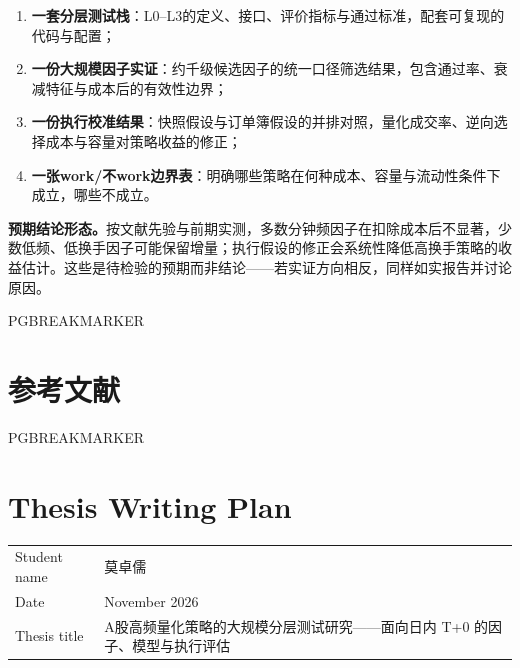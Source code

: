 \documentclass[11pt,a4paper]{article}
\begin{document}
\begin{enumerate}
  \item \textbf{一套分层测试栈}：L0--L3的定义、接口、评价指标与通过标准，配套可复现的代码与配置；
  \item \textbf{一份大规模因子实证}：约千级候选因子的统一口径筛选结果，包含通过率、衰减特征与成本后的有效性边界；
  \item \textbf{一份执行校准结果}：快照假设与订单簿假设的并排对照，量化成交率、逆向选择成本与容量对策略收益的修正；
  \item \textbf{一张work/不work边界表}：明确哪些策略在何种成本、容量与流动性条件下成立，哪些不成立。
\end{enumerate}

\textbf{预期结论形态。}按文献先验与前期实测，多数分钟频因子在扣除成本后不显著，少数低频、低换手因子可能保留增量；执行假设的修正会系统性降低高换手策略的收益估计。这些是待检验的预期而非结论——若实证方向相反，同样如实报告并讨论原因。


PGBREAKMARKER

\section*{参考文献}


PGBREAKMARKER


\section*{Thesis Writing Plan}

\begin{table}
\begin{tabular}{ll}
Student name & 莫卓儒 \\
Date & November 2026 \\
Thesis title & A股高频量化策略的大规模分层测试研究——面向日内 T+0 的因子、模型与执行评估 \\
\end{tabular}
\end{table}


\vspace{1em}
\end{document}
